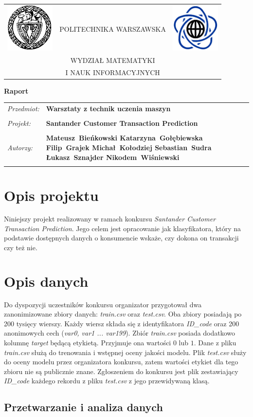 \documentclass[12pt]{article}
\renewcommand{\maketitle}{
\begin{titlepage}
\begin{table}[t]
\centering
\begin{tabular}[t]{lcr}
 \includegraphics[width=70pt,height=70pt]{PW} & POLITECHNIKA WARSZAWSKA & \includegraphics[width=70pt,height=70pt]{MiNI}\\
& WYDZIAŁ MATEMATYKI & \\
& I NAUK INFORMACYJNYCH &
\end{tabular}
\end{table}
\vspace*{3cm}
  \begin{center}
    \LARGE
    \textbf {Raport}\\
   \vspace*{2 cm}
\begin{table}[!htp]
\begin{tabular}{p{4cm}p{10cm}}
\textit{Przedmiot:} &\textbf {Warsztaty z technik uczenia maszyn} \\
\\
\textit{Projekt:} &\textbf {Santander Customer Transaction Prediction} \\
\\
\textit{Autorzy:} &\textbf {Mateusz~Bieńkowski \newline
	Katarzyna~Gołębiewska \newline
	Filip~Grajek \newline
	Michał~Kołodziej \newline
	Sebastian~Sudra \newline
	Łukasz~Sznajder \newline
	Nikodem~Wiśniewski \newline 
 } \\
\\
\end{tabular}
\end{table}

\vspace{4 cm}
  \center{\small Warszawa, dnia \today}
\end{center}
\end{titlepage}
}
\begin{document}
\maketitle

\newpage

\section{Opis projektu}

Niniejszy projekt realizowany w ramach konkursu \textit{Santander Customer Transaction Prediction}\cite{santanderkaggle}. Jego celem jest opracowanie jak klasyfikatora, który na podstawie dostępnych danych o konsumencie wskaże, czy dokona on transakcji czy też nie. 

\section{Opis danych}

Do dyspozycji uczestników konkursu organizator przygotował dwa zanonimizowane zbiory danych: \textit{train.csv} oraz \textit{test.csv}. Oba zbiory posiadają po 200 tysięcy wierszy. Każdy wiersz składa się z identyfikatora \textit{ID\_code} oraz 200 anonimowych cech (\textit{var0, var1 ... var199}). Zbiór \textit{train.csv} posiada dodatkowo kolumnę \textit{target} będącą etykietą. Przyjmuje ona wartości $0$ lub $1$. Dane z pliku \textit{train.csv} służą do trenowania i wstępnej oceny jakości modelu. Plik \textit{test.csv} służy do oceny modelu przez organizatora konkursu, zatem wartości etykiet dla tego zbioru nie są publicznie znane. Zgłoszeniem do konkursu jest plik zestawiający \textit{ID\_code} każdego rekordu z pliku \textit{test.csv} z jego przewidywaną klasą.


\subsection{Przetwarzanie i analiza danych}
\end{document}
